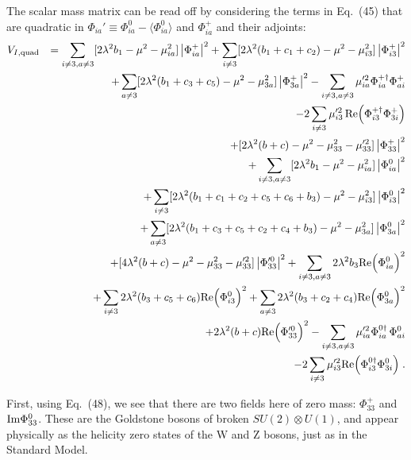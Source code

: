 \documentclass[12pt]{article}
\begin{document}
The scalar mass matrix can be read off by considering the terms in Eq.~(45) that are quadratic in $\Phi_{ia}'\equiv \Phi_{ia}^0-\langle \Phi_{ia}^0\rangle$ and  $\Phi^+_{ia}$ and their adjoints:
\begin{eqnarray}
V_{I, {\rm quad}}&&=\sum_{i\neq 3, a\neq 3} [2\lambda^2 b_1-\mu^2-\mu^2_{ia}]\left|\Phi_{ia}^+\right|^2
+\sum_{i\neq 3}[2\lambda^2(b_1+c_1+c_2)-\mu^2-\mu_{i3}^2] \left|\Phi_{i3}^+\right|^2\nonumber\\&&+  \sum_{a\neq 3} [2\lambda^2(b_1+c_3+c_5)-\mu^2-\mu_{3a}^2]\left|\Phi_{3a}^+\right|^2-\sum_{i\neq 3, a\neq 3}\mu'^2_{ia}\Phi^{+\dagger}_{ia} \Phi^+_{ai} \nonumber\\&&
-2\sum_{i\neq 3}\mu'^2_{i3}\,{\rm Re}\Big(\Phi^{+\dagger}_{i3} \Phi^+_{3i}\Big)
\nonumber\\&& +[2\lambda^2(b+c)-\mu^2-\mu^2_{33}-\mu'^2_{33}]\left|\Phi_{33}^+\right|^2\nonumber\\
&&+\sum_{i\neq 3, a\neq 3} [2\lambda^2 b_1-\mu^2-\mu^2_{ia}]\left|\Phi_{ia}^0\right|^2\nonumber\\&&+\sum_{i\neq 3}[2\lambda^2(b_1+c_1+c_2+c_5+c_6+b_3)-\mu^2-\mu_{i3}^2] \left|\Phi_{i3}^0\right|^2\nonumber\\&&
+\sum_{a\neq 3}[2\lambda^2(b_1+c_3+c_5+c_2+c_4+b_3)-\mu^2-\mu_{3a}^2] \left|\Phi^0_{3a}\right|^2\nonumber\\&&
+[4\lambda^2(b+c)-\mu^2-\mu^2_{33}-\mu'^2_{33}]\left|\Phi'^0_{33}\right|^2+\sum_{i\neq 3, a\neq 3}2\lambda^2 b_3{\rm Re}\Big(\Phi_{ia}^0\Big)^2\nonumber\\&&
+\sum_{i\neq 3}2\lambda^2 (b_3+c_5+c_6){\rm Re}\Big(\Phi_{i3}^0\Big)^2+\sum_{a\neq 3}2\lambda^2 (b_3+c_2+c_4){\rm Re}\Big(\Phi_{3a}^0\Big)^2
\nonumber\\&&+2\lambda^2(b+c){\rm Re}\Big(\Phi'^0_{33}\Big)^2-\sum_{i\neq 3, a\neq 3}\mu'^2_{ia}\Phi_{ia}^{0\dagger}\,\Phi_{ai}^0\nonumber\\&&
-2\sum_{i\neq 3}\mu'^2_{i3}{\rm Re}\Big(\Phi_{i3}^{0\dagger}\Phi^0_{3i}\Big)
\;.
\end{eqnarray}





First, using Eq.~(48), we see that there are two fields here of zero mass: $\Phi_{33}^+$ and ${\rm Im}\Phi^0_{33}$.  These are the Goldstone bosons of broken $SU(2)\otimes U(1)$, and appear physically as the helicity zero states of the W and Z bosons, just as in the Standard Model.
\end{document}
